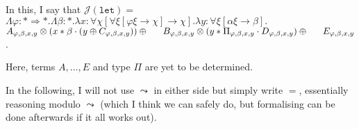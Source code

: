 \documentclass[runningheads,a4paper]{llncs}
\newcommand{\Termmap}{\mathcal{J}}
\newcommand{\arrtype}{\rightarrow}
\newcommand{\arrkind}{\Rightarrow}
\begin{document}
In this, I say that $\Termmap(\mathtt{let}) =$ \\
$\Lambda \varphi : *
\arrkind *.\Lambda \beta : *.\lambda x : \forall \chi[\forall \xi[
\varphi\xi \arrtype \chi] \arrtype \chi].\lambda y : \forall \xi[
\alpha \xi \arrtype \beta].$ \\
\phantom{AB}\hfill
  $A_{\varphi,\beta,x,y} \otimes
    (x * \beta \cdot (y \oplus C_{\varphi,\beta,x,y}))
  \oplus \\
\phantom{AB}\hfill
  B_{\varphi,\beta,x,y} \otimes (y * \Pi_{\varphi,\beta,x,y} \cdot
    D_{\varphi,\beta,x,y})
  \oplus \\
\phantom{AB}\hfill
  E_{\varphi,\beta,x,y}$.

Here, terms $A,\dots,E$ and type $\Pi$ are yet to be determined.

In the following, I will not use $\leadsto$ in either side but simply
write $=$, essentially reasoning modulo $\leadsto$ (which I think we
can safely do, but formalising can be done afterwards if it all works
out).
\end{document}
